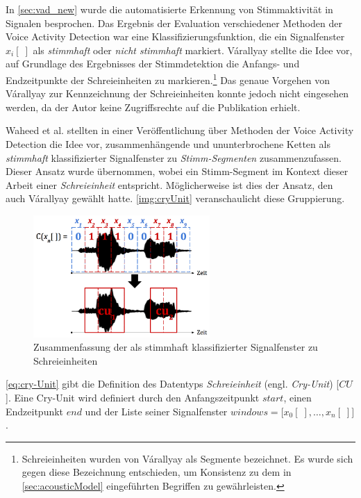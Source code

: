 In \autoref{sec:vad_new} wurde die automatisierte Erkennung von Stimmaktivität in Signalen besprochen. Das Ergebnis der Evaluation verschiedener Methoden der Voice Activity Detection war eine Klassifizierungsfunktion, die ein Signalfenster $x_i[\;]$ als \emph{stimmhaft} oder \emph{nicht stimmhaft} markiert. Várallyay \cite[S. 16 - 17]{cry_thesis} stellte die Idee vor, auf Grundlage des Ergebnisses der Stimmdetektion die Anfangs- und Endzeitpunkte der Schreieinheiten zu markieren.\footnote{\glqq Schreieinheiten\grqq{} wurden von Várallyay als \glqq Segmente\grqq{} bezeichnet. Es wurde sich gegen diese Bezeichnung entschieden, um Konsistenz zu dem in \autoref{sec:acousticModel} eingeführten Begriffen zu gewährleisten.} Das genaue Vorgehen von Várallyay zur Kennzeichnung der Schreieinheiten konnte jedoch nicht eingesehen werden, da der Autor keine Zugriffsrechte auf die Publikation erhielt.

Waheed et al. \cite{vad_entropy} stellten in einer Veröffentlichung über Methoden der Voice Activity Detection die Idee vor, zusammenhängende und ununterbrochene Ketten als \emph{stimmhaft} klassifizierter Signalfenster zu \emph{Stimm-Segmenten} zusammenzufassen. Dieser Ansatz wurde übernommen, wobei ein Stimm-Segment im Kontext dieser Arbeit einer \emph{Schreieinheit} entspricht. Möglicherweise ist dies der Ansatz, den auch  Várallyay \cite[S. 16 - 17]{cry_thesis} gewählt hatte. \autoref{img:cryUnit} veranschaulicht diese Gruppierung. 

\begin{figure}[h]
	\centering
	\includegraphics[width=0.6\textwidth]{bilder/cry-Unit02.png}
	\caption{Zusammenfassung der als stimmhaft klassifizierter Signalfenster zu Schreieinheiten}
	\label{img:cryUnit}
\end{figure}

\autoref{eq:cry-Unit} gibt die Definition des Datentyps \emph{Schreieinheit} (engl. \emph{Cry-Unit}) [$CU$]. Eine Cry-Unit wird definiert durch den Anfangszeitpunkt $start$, einen Endzeitpunkt $end$ und der Liste seiner Signalfenster $windows = \big[x_0[\;], \ldots, x_n[\;]\big]$.

